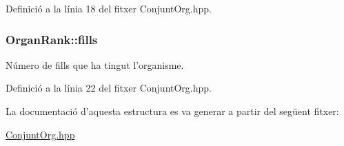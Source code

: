 Definició a la línia 18 del fitxer Conjunt\-Org.\-hpp.

\hypertarget{struct_organ_rank_ac822919ccf32979e8c4d8384a1949b08}{
\subsubsection[{fills}]{\setlength{\rightskip}{0pt plus 5cm}Organ\-Rank\-::fills}}\label{struct_organ_rank_ac822919ccf32979e8c4d8384a1949b08}


Número de fills que ha tingut l'organisme. 



Definició a la línia 22 del fitxer Conjunt\-Org.\-hpp.



La documentació d'aquesta estructura es va generar a partir del següent fitxer\-:\begin{DoxyCompactItemize}
\item 
\hyperlink{_conjunt_org_8hpp}{Conjunt\-Org.\-hpp}\end{DoxyCompactItemize}
